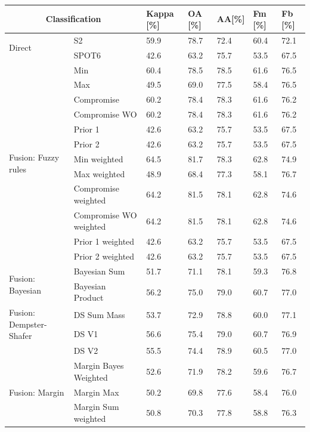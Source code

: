 \documentclass[10pt]{article}
\begin{document}
\begin{table}[H]
	\centering
	\begin{tabular}{p{1.8cm}llllll}\toprule
		 \multicolumn{2}{c}{\textbf{Classification}}& \textbf{Kappa} [\%] & \textbf{OA} [\%] & \textbf{AA}[\%] & \textbf{Fm} [\%] & \textbf{Fb} [\%]\\\hline
		\multirow{2}{*}{Direct}	& S2 & 59.9 & 78.7 & 72.4 & 60.4 & 72.1 \\
		& SPOT6 & 42.6 & 63.2 & 75.7 & 53.5 & 67.5 \\\hline
		\multirow{12}{*}{\parbox{1.8cm}{Fusion: Fuzzy rules}} & Min & 60.4 & 78.5 & 78.5 & 61.6 & 76.5 \\
		& Max & 49.5 & 69.0 & 77.5 & 58.4 & 76.5 \\
		& Compromise & 60.2 & 78.4 & 78.3 & 61.6 & 76.2 \\
		& Compromise WO & 60.2 & 78.4 & 78.3 & 61.6 & 76.2 \\
		& Prior 1 & 42.6 & 63.2 & 75.7 & 53.5 & 67.5 \\
		& Prior 2 & 42.6 & 63.2 & 75.7 & 53.5 & 67.5 \\
		& Min weighted & 64.5 & 81.7 & 78.3 & 62.8 & 74.9 \\
		& Max weighted & 48.9 & 68.4 & 77.3 & 58.1 & 76.7 \\
		& Compromise weighted & 64.2 & 81.5 & 78.1 & 62.8 & 74.6 \\
		& Compromise WO weighted & 64.2 & 81.5 & 78.1 & 62.8 & 74.6 \\
		& Prior 1 weighted & 42.6 & 63.2 & 75.7 & 53.5 & 67.5 \\
		& Prior 2 weighted & 42.6 & 63.2 & 75.7 & 53.5 & 67.5 \\\hline
		\multirow{2}{*}{\parbox{1.8cm}{Fusion: Bayesian}}& Bayesian Sum & 51.7 & 71.1 & 78.1 & 59.3 & 76.8 \\
		& Bayesian Product & 56.2 & 75.0 & 79.0 & 60.7 & 77.0 \\\hline
		\multirow{2}{*}{\parbox{1.8cm}{Fusion: Dempster-Shafer}}& DS Sum Mass & 53.7 & 72.9 & 78.8 & 60.0 & 77.1 \\
		& DS V1 & 56.6 & 75.4 & 79.0 & 60.7 & 76.9 \\
		& DS V2 & 55.5 & 74.4 & 78.9 & 60.5 & 77.0 \\\hline
		\multirow{3}{*}{\parbox{1.8cm}{Fusion: Margin}} & Margin Bayes Weighted & 52.6 & 71.9 & 78.2 & 59.6 & 76.7 \\
		& Margin Max & 50.2 & 69.8 & 77.6 & 58.4 & 76.0 \\
		& Margin Sum weighted & 50.8 & 70.3 & 77.8 & 58.8 & 76.3 \\\hline

\end{tabular}
\end{table}
\end{document}
